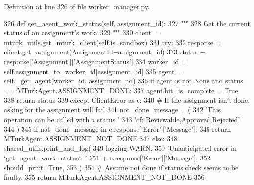 Definition at line 326 of file worker\+\_\+manager.\+py.


\begin{DoxyCode}
326     \textcolor{keyword}{def }get\_agent\_work\_status(self, assignment\_id):
327         \textcolor{stringliteral}{"""}
328 \textcolor{stringliteral}{        Get the current status of an assignment's work.}
329 \textcolor{stringliteral}{        """}
330         client = mturk\_utils.get\_mturk\_client(self.is\_sandbox)
331         \textcolor{keywordflow}{try}:
332             response = client.get\_assignment(AssignmentId=assignment\_id)
333             status = response[\textcolor{stringliteral}{'Assignment'}][\textcolor{stringliteral}{'AssignmentStatus'}]
334             worker\_id = self.assignment\_to\_worker\_id[assignment\_id]
335             agent = self.\_get\_agent(worker\_id, assignment\_id)
336             \textcolor{keywordflow}{if} agent \textcolor{keywordflow}{is} \textcolor{keywordflow}{not} \textcolor{keywordtype}{None} \textcolor{keywordflow}{and} status == MTurkAgent.ASSIGNMENT\_DONE:
337                 agent.hit\_is\_complete = \textcolor{keyword}{True}
338             \textcolor{keywordflow}{return} status
339         \textcolor{keywordflow}{except} ClientError \textcolor{keyword}{as} e:
340             \textcolor{comment}{# If the assignment isn't done, asking for the assignment will fail}
341             not\_done\_message = (
342                 \textcolor{stringliteral}{'This operation can be called with a status '}
343                 \textcolor{stringliteral}{'of: Reviewable,Approved,Rejected'}
344             )
345             \textcolor{keywordflow}{if} not\_done\_message \textcolor{keywordflow}{in} e.response[\textcolor{stringliteral}{'Error'}][\textcolor{stringliteral}{'Message'}]:
346                 \textcolor{keywordflow}{return} MTurkAgent.ASSIGNMENT\_NOT\_DONE
347             \textcolor{keywordflow}{else}:
348                 shared\_utils.print\_and\_log(
349                     logging.WARN,
350                     \textcolor{stringliteral}{'Unanticipated error in `get\_agent\_work\_status`: '}
351                     + e.response[\textcolor{stringliteral}{'Error'}][\textcolor{stringliteral}{'Message'}],
352                     should\_print=\textcolor{keyword}{True},
353                 )
354                 \textcolor{comment}{# Assume not done if status check seems to be faulty.}
355                 \textcolor{keywordflow}{return} MTurkAgent.ASSIGNMENT\_NOT\_DONE
356 
\end{DoxyCode}
\mbox{\label{classparlai_1_1mturk_1_1core_1_1worker__manager_1_1WorkerManager_a451312cbfad4b059777195ffcdbc0410}} 
